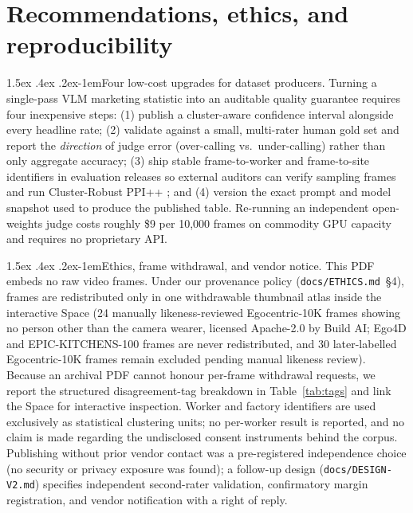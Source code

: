 \documentclass[11pt]{article}
\makeatletter
\renewcommand\paragraph{\@startsection{paragraph}{4}{\z@}%
  {1.5ex \@plus .4ex \@minus .2ex}{-1em}{\normalfont\normalsize\bfseries}}
\makeatother
\begin{document}
\section{Recommendations, ethics, and reproducibility}
\label{sec:ethics}

\paragraph{Four low-cost upgrades for dataset producers.}
Turning a single-pass VLM marketing statistic into an auditable quality guarantee requires four
inexpensive steps: (1) publish a cluster-aware confidence interval alongside every headline rate;
(2) validate against a small, multi-rater human gold set and report the \emph{direction} of judge
error (over-calling vs.\ under-calling) rather than only aggregate accuracy; (3) ship stable
frame-to-worker and frame-to-site identifiers in evaluation releases so external auditors can
verify sampling frames and run Cluster-Robust PPI++ \citep{broska2026crppi}; and (4) version the
exact prompt and model snapshot used to produce the published table. Re-running an independent
open-weights judge costs roughly \$9 per 10{,}000 frames on commodity GPU capacity and requires no
proprietary API.

\paragraph{Ethics, frame withdrawal, and vendor notice.}
This PDF embeds no raw video frames. Under our provenance policy (\texttt{docs/ETHICS.md}~\S4),
frames are redistributed only in one withdrawable thumbnail atlas inside the interactive Space
(24 manually likeness-reviewed Egocentric-10K frames showing no person other than the camera
wearer, licensed Apache-2.0 by Build AI; Ego4D and EPIC-KITCHENS-100 frames are never
redistributed, and 30 later-labelled Egocentric-10K frames remain excluded pending manual likeness
review). Because an archival PDF cannot honour per-frame withdrawal requests, we report the
structured disagreement-tag breakdown in Table~\ref{tab:tags} and link the Space for interactive
inspection. Worker and factory identifiers are used exclusively as statistical clustering units;
no per-worker result is reported, and no claim is made regarding the undisclosed consent
instruments behind the corpus. Publishing without prior vendor contact was a pre-registered
independence choice (no security or privacy exposure was found); a follow-up design
(\texttt{docs/DESIGN-V2.md}) specifies independent second-rater validation, confirmatory margin
registration, and vendor notification with a right of reply.
\end{document}
